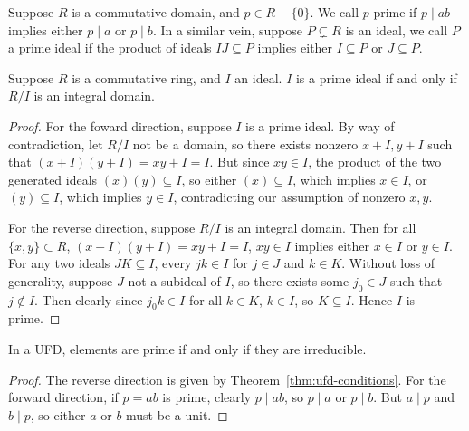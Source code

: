 \begin{definition}
    Suppose \(R\) is a commutative domain, and \(p \in R - \{0\}\).
    We call \(p\) prime if \(p \mid ab\)
    implies either \(p \mid a\) or \(p \mid b\).
    In a similar vein, suppose \(P \subsetneq R\) is an ideal,
    we call \(P\) a prime ideal if the product of ideals \(IJ \subseteq P\)
    implies either \(I \subseteq P\) or \(J \subseteq P\).
\end{definition}
\begin{proposition}\label{prop:prime-quotient-domain}
    Suppose \(R\) is a commutative ring, and \(I\) an ideal.
    \(I\) is a prime ideal if and only if \(R/I\) is an integral domain.
\end{proposition}
\begin{proof}
    For the foward direction, suppose \(I\) is a prime ideal.
    By way of contradiction, let \(R/I\) not be a domain,
    so there exists nonzero \(x+I, y+I\) such that \((x+I)(y+I) = xy+I = I\).
    But since \(xy \in I\),
    the product of the two generated ideals \((x)(y) \subseteq I\),
    so either \((x) \subseteq I\), which implies \(x \in I\),
    or \((y) \subseteq I\), which implies \(y \in I\),
    contradicting our assumption of nonzero \(x,y\).

    For the reverse direction, suppose \(R/I\) is an integral domain.
    Then for all \(\{x,y\} \subset R\), \((x+I)(y+I) = xy+I = I\),
    \(xy \in I\) implies either \(x \in I\) or \(y \in I\).
    For any two ideals \(JK \subseteq I\),
    every \(jk \in I\) for \(j \in J\) and \(k \in K\).
    Without loss of generality, suppose \(J\) not a subideal of \(I\),
    so there exists some \(j_0 \in J\) such that \(j \notin I\).
    Then clearly since \(j_0 k \in I\) for all \(k \in K\),
    \(k \in I\), so \(K \subseteq I\).
    Hence \(I\) is prime.
\end{proof}

\begin{lemma}
    In a UFD, elements are prime if and only if they are irreducible.
\end{lemma}
\begin{proof}
    The reverse direction is given by Theorem~\ref{thm:ufd-conditions}.
    For the forward direction,
    if \(p = ab\) is prime, clearly \(p \mid ab\),
    so \(p \mid a\) or \(p \mid b\).
    But \(a \mid p\) and \(b \mid p\),
    so either \(a\) or \(b\) must be a unit.
\end{proof}

